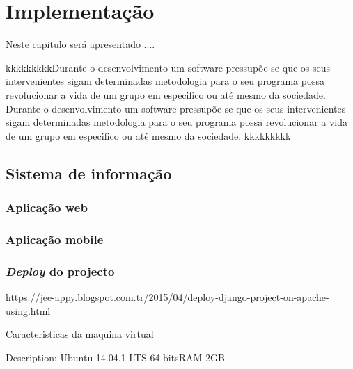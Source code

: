 



\chapter{Implementação}

Neste capitulo será apresentado ....

kkkkkkkkkDurante o desenvolvimento um software pressupõe-se que os seus intervenientes sigam determinadas metodologia para o seu programa possa revolucionar a vida de um grupo em especifico ou até mesmo da sociedade. 
Durante o desenvolvimento um software pressupõe-se que os seus intervenientes sigam determinadas metodologia para o seu programa possa revolucionar a vida de um grupo em especifico ou até mesmo da sociedade. kkkkkkkkk

















\section{Sistema de informação}




\subsection{Aplicação web}





\subsection{Aplicação mobile}




\subsection{\textit{Deploy} do projecto}


https://jee-appy.blogspot.com.tr/2015/04/deploy-django-project-on-apache-using.html

Caracteristicas da maquina virtual

Description:	Ubuntu 14.04.1 LTS
64 bitsRAM 2GB 






